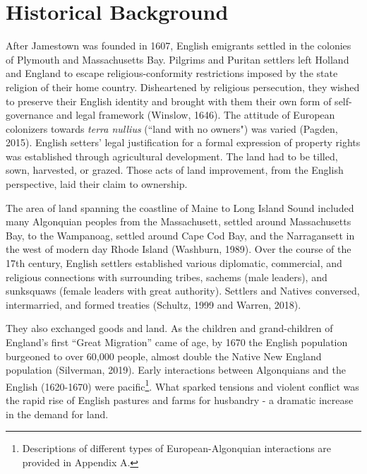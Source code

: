 \documentclass[sn-mathphys]{sn-jnl}%
\theoremstyle{thmstyleone}%
\theoremstyle{thmstyletwo}%
\theoremstyle{thmstylethree}%
\begin{document}
\section{Historical Background}\label{sec2}

After Jamestown was founded in 1607, English emigrants settled in the colonies of Plymouth and Massachusetts Bay. Pilgrims and Puritan settlers left Holland and England to escape religious-conformity restrictions imposed by the state religion of their home country. Disheartened by religious persecution, they wished to preserve their English identity and brought with them their own form of self-governance and legal framework (Winslow, 1646). The attitude of European colonizers towards {\em terra nullius} (``land with no owners") was varied (Pagden, 2015). 
English setters' legal justification for a formal expression of property rights was established through agricultural development. The land had to be tilled, sown, harvested, or grazed. Those acts of land improvement, from the English perspective, laid their claim to ownership.

The area of land spanning the coastline of Maine to Long Island Sound included many Algonquian peoples from the Massachusett, settled around Massachusetts Bay, to the Wampanoag, settled around Cape Cod Bay, and the Narragansett in the west of modern day Rhode Island (Washburn, 1989). Over the course of the 17th century, English settlers established various diplomatic, commercial, and religious connections with surrounding tribes, sachems (male leaders), and sunksquaws (female leaders with great authority). Settlers and Natives conversed, intermarried, and formed treaties (Schultz, 1999 and Warren, 2018). 

They also exchanged goods and land. As the children and grand-children of England's first ``Great Migration'' came of age, by 1670 the English population burgeoned to over 60,000 people, almost double the Native New England population (Silverman, 2019). Early interactions between Algonquians and the English (1620-1670) were pacific\footnote{Descriptions of different types of European-Algonquian interactions are provided in Appendix A.}. What sparked tensions and violent conflict was the rapid rise of English pastures and farms for husbandry - a dramatic increase in the demand for land. 
\end{document}
